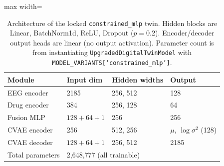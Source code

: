 \begin{table}[!t]
\centering
\footnotesize
\setlength{\tabcolsep}{3pt}
\caption{Architecture of the locked \texttt{constrained\_mlp} twin. Hidden blocks are Linear, BatchNorm1d, ReLU, Dropout ($p=0.2$). Encoder/decoder output heads are linear (no output activation). Parameter count is from instantiating \texttt{UpgradedDigitalTwinModel} with \texttt{MODEL\_VARIANTS['constrained\_mlp']}.}
\label{tab:architecture}
\begin{adjustbox}{max width=\columnwidth}
\begin{tabular}{@{}llll@{}}
\toprule
Module & Input dim & Hidden widths & Output \\
\midrule
EEG encoder & 2185 & 256, 512 & 128 \\
Drug encoder & 384 & 256, 128 & 64 \\
Fusion MLP & $128{+}64{+}1$ & 256 & 256 \\
CVAE encoder & 256 & 512, 256 & $\mu$, $\log\sigma^2$ (128) \\
CVAE decoder & $128{+}64{+}1$ & 256, 512 & 2185 \\
\midrule
Total parameters & \multicolumn{3}{l}{2{,}648{,}777 (all trainable)} \\
\bottomrule
\end{tabular}
\end{adjustbox}
\end{table}
